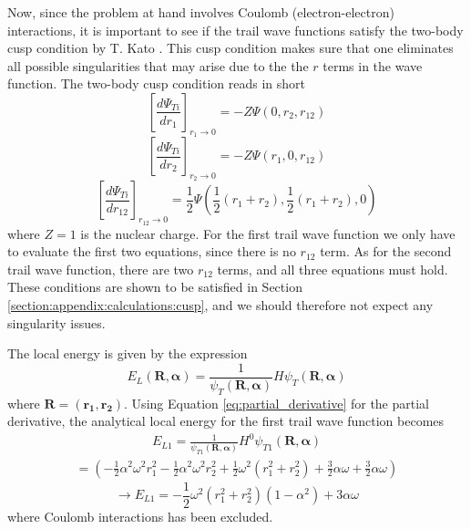 \documentclass[12pt,english,a4paper]{article}
\begin{document}
Now, since the problem at hand involves Coulomb (electron-electron) interactions, it is important to see if the trail wave functions satisfy the two-body cusp condition by T. Kato \cite{kato_cusp}. This cusp condition makes sure that one eliminates all possible singularities that may arise due to the the $r$ terms in the wave function. The two-body cusp condition reads in short
\begin{equation}
    \left[\frac{d\Psi_{Ti}}{dr_1}\right]_{r_1\rightarrow 0}=-Z\Psi(0,r_2,r_{12})
    \label{cusp_r1}
\end{equation}
\begin{equation}
    \left[\frac{d\Psi_{Ti}}{dr_2}\right]_{r_2\rightarrow 0}=-Z\Psi(r_1,0,r_{12})
    \label{cusp_r2}
\end{equation}
\begin{equation}
    \left[\frac{d\Psi_{Ti}}{dr_{12}}\right]_{r_{12}\rightarrow 0}=\frac{1}{2}\Psi(\frac{1}{2}(r_1+r_2),\frac{1}{2}(r_1+r_2),0)
    \label{cusp_r12}
\end{equation}
where $Z=1$ is the nuclear charge. For the first trail wave function we only have to evaluate the first two equations, since there is no $r_{12}$ term. As for the second trail wave function, there are two $r_{12}$ terms, and all three equations must hold. These conditions are shown to be satisfied in Section \ref{section:appendix:calculations:cusp}, and we should therefore not expect any singularity issues.

The local energy is given by the expression
\begin{equation}
    E_L(\boldsymbol{R},\boldsymbol{\alpha})=\frac{1}{\psi_T(\boldsymbol{R},\boldsymbol{\alpha})}H\psi_T(\boldsymbol{R},\boldsymbol{\alpha})
    \label{eq:local_energy}
\end{equation}
where $\boldsymbol{R}=(\boldsymbol{r_1},\boldsymbol{r_2})$. Using Equation \eqref{eq:partial_derivative} for the partial derivative, the analytical local energy for the first trail wave function becomes
\begin{align*}
    E_{L1}=\frac{1}{\psi_{T1}(\boldsymbol{R},\boldsymbol{\alpha})}H^0\psi_{T1}(\boldsymbol{R},\boldsymbol{\alpha})
\end{align*}
\begin{align*}
    =\left(-\frac{1}{2}\alpha^2\omega^2r_1^2-\frac{1}{2}\alpha^2\omega^2r_2^2+\frac{1}{2}\omega^2\left(r_1^2+r_2^2\right)+\frac{3}{2}\alpha\omega +\frac{3}{2}\alpha\omega\right)
\end{align*}
\begin{equation}
    \rightarrow E_{L1}=-\frac{1}{2}\omega^2\left(r_1^2+r_2^2\right)\left(1-\alpha^2\right)+3\alpha\omega
    \label{eq:local_energy_t1}
\end{equation}
where Coulomb interactions has been excluded. 
\end{document}
